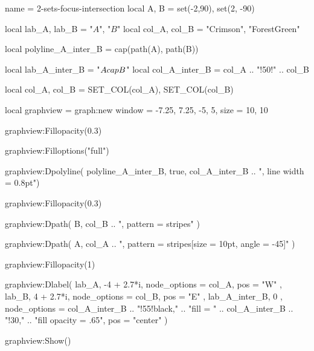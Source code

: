 \documentclass{standalone}
\begin{document}
\begin{luadraw}{name = 2-sets-focus-intersection}
  local A, B = set(-2,90), set(2, -90)

  local lab_A, lab_B = "$A$", "$B$"
  local col_A, col_B = "Crimson", "ForestGreen"

  local polyline_A_inter_B = cap(path(A), path(B))

  local lab_A_inter_B = "$A \\cap B$"
  local col_A_inter_B = col_A .. "!50!" .. col_B

  local col_A, col_B = SET_COL(col_A), SET_COL(col_B)

  local graphview = graph:new{
    window = {-7.25, 7.25, -5, 5},
    size   = {10, 10}
  }

  graphview:Fillopacity(0.3)

  graphview:Filloptions("full")

  graphview:Dpolyline(
    polyline_A_inter_B,
    true,
    col_A_inter_B .. ", line width = 0.8pt")

  graphview:Fillopacity(0.3)

  graphview:Dpath(
    B,
    col_B .. ", pattern = stripes"
  )

  graphview:Dpath(
    A,
    col_A .. ", pattern = {stripes[size = 10pt, angle = -45]}"
  )

  graphview:Fillopacity(1)

  graphview:Dlabel(
    lab_A, -4 + 2.7*i, {
      node_options = col_A,
      pos = "W"
    },
    lab_B, 4 + 2.7*i, {
      node_options = col_B,
      pos = "E"
    },
    lab_A_inter_B, 0 , {
      node_options = col_A_inter_B .. "!55!black,"
                  .. "fill = " .. col_A_inter_B .. "!30,"
                  .. "fill opacity = .65",
      pos = "center"
     })

  graphview:Show()
\end{luadraw}
\end{document}
